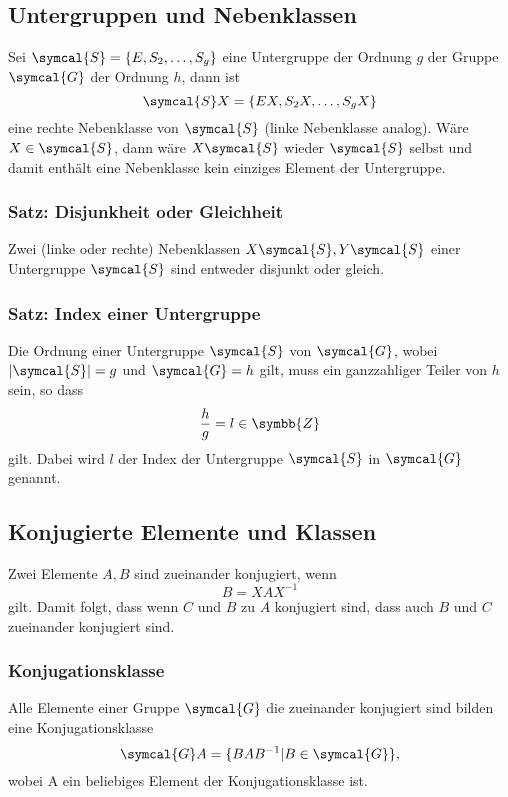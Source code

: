 \documentclass[
  captions=tableheading,  %
  titlepage=firstiscover, %
]{scrartcl}
\begin{document}
\subsection{Untergruppen und Nebenklassen}
Sei $\symcal{S}  = \{E, S_2, \ldots, S_g \}$ eine Untergruppe der Ordnung $g$ der Gruppe $\symcal{G}$
der Ordnung $h$, dann ist 
\begin{equation*}
  \symcal{S}X = \{ EX, S_2X, \ldots, S_g X\}
\end{equation*}
eine rechte Nebenklasse von $\symcal{S}$ (linke Nebenklasse analog).
Wäre $X \in \symcal{S}$, dann wäre $X\symcal{S}$ wieder $\symcal{S}$ selbst und damit enthält
eine Nebenklasse kein einziges Element der Untergruppe.\\
\subsubsection{Satz: Disjunkheit oder Gleichheit}
Zwei (linke oder rechte) Nebenklassen $X\symcal{S}, Y\symcal{S}$ einer Untergruppe $\symcal{S}$ sind entweder 
disjunkt oder gleich.
\subsubsection{Satz: Index einer Untergruppe}
Die Ordnung einer Untergruppe $\symcal{S}$ von $\symcal{G}$, wobei 
$|\symcal{S}| = g$ und $\symcal{G} = h$ gilt, muss ein ganzzahliger Teiler von $h$ sein, so dass 
\begin{equation*}
  \frac{h}{g} = l \in \symbb{Z}
\end{equation*}
gilt.
Dabei wird $l$ der Index der Untergruppe $\symcal{S}$ in $\symcal{G}$ genannt.
\subsection{Konjugierte Elemente und Klassen}
Zwei Elemente $A, B$ sind zueinander konjugiert, wenn 
\begin{equation*}
  B = X A X^{-1}
\end{equation*}
gilt.
Damit folgt, dass wenn $C$ und $B$ zu $A$ konjugiert sind, dass auch $B$ und $C$ zueinander konjugiert sind.
\subsubsection{Konjugationsklasse}
Alle Elemente einer Gruppe $\symcal{G}$ die zueinander konjugiert sind bilden eine Konjugationsklasse
\begin{equation*}
  \symcal{G} A = \{BAB^{-1} | B \in \symcal{G} \},
\end{equation*}
wobei A ein beliebiges Element der Konjugationsklasse ist.
\end{document}

